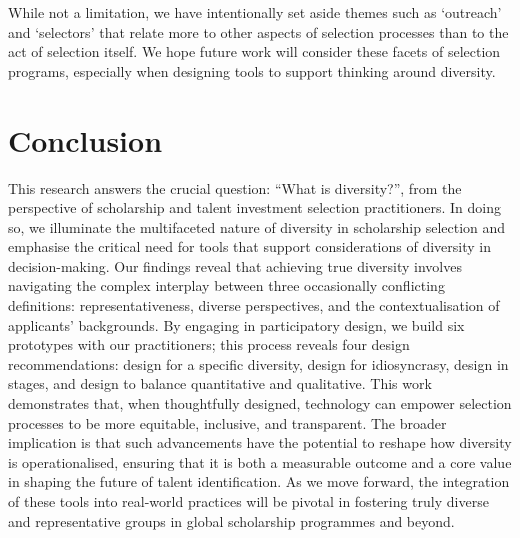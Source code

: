 While not a limitation, we have intentionally set aside themes such as `outreach' and `selectors' that relate more to other aspects of selection processes than to the act of selection itself. We hope future work will consider these facets of selection programs, especially when designing tools to support thinking around diversity.

\section{Conclusion}
This research answers the crucial question: ``What is diversity?'', from the perspective of scholarship and talent investment selection practitioners. In doing so, we illuminate the multifaceted nature of diversity in scholarship selection and emphasise the critical need for tools that support considerations of diversity in decision-making. Our findings reveal that achieving true diversity involves navigating the complex interplay between three occasionally conflicting definitions: representativeness, diverse perspectives, and the contextualisation of applicants' backgrounds. By engaging in participatory design, we build six prototypes with our practitioners; this process reveals four design recommendations: design for a specific diversity, design for idiosyncrasy, design in stages, and design to balance quantitative and qualitative. This work demonstrates that, when thoughtfully designed, technology can empower selection processes to be more equitable, inclusive, and transparent. The broader implication is that such advancements have the potential to reshape how diversity is operationalised, ensuring that it is both a measurable outcome and a core value in shaping the future of talent identification. As we move forward, the integration of these tools into real-world practices will be pivotal in fostering truly diverse and representative groups in global scholarship programmes and beyond.